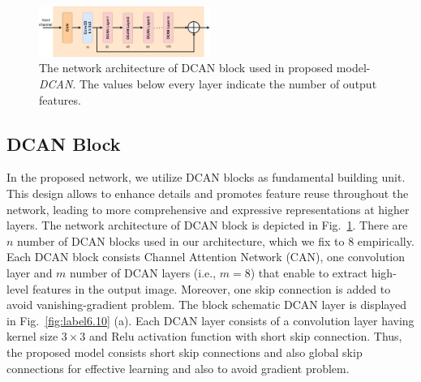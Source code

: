 \documentclass[conference]{IEEEtran}
\begin{document}
\begin{figure}[h!]
    \centering
    \includegraphics[width=0.5\textwidth]{2.drawio (4).png} %
    \caption{The network architecture of DCAN block used in proposed model-\emph{DCAN}. The values below every layer indicate the number of output features.}
    \label{fig:label6.9}
\end{figure}
\subsection{DCAN Block}
In the proposed network, we utilize DCAN blocks as fundamental building unit. This design allows to enhance details and promotes feature reuse throughout the network, leading to more comprehensive and expressive representations at higher layers. The network architecture of DCAN block is depicted in Fig.~\ref{fig:label6.9}. There are $n$ number of DCAN blocks used in our architecture, which we fix to $8$ empirically. Each DCAN block consists Channel Attention Network (CAN), one convolution layer and $m$ number of DCAN layers (i.e., $m=8$) that enable to extract high-level features in the output image. Moreover, one skip connection is added to avoid vanishing-gradient problem. The block schematic DCAN layer is displayed in Fig.~\ref{fig:label6.10} (a). Each DCAN layer consists of a convolution layer having kernel size $3\times3$ and Relu activation function with short skip connection. Thus, the proposed model consists short skip connections and also global skip connections for effective learning and also to avoid gradient problem. 
\end{document}
